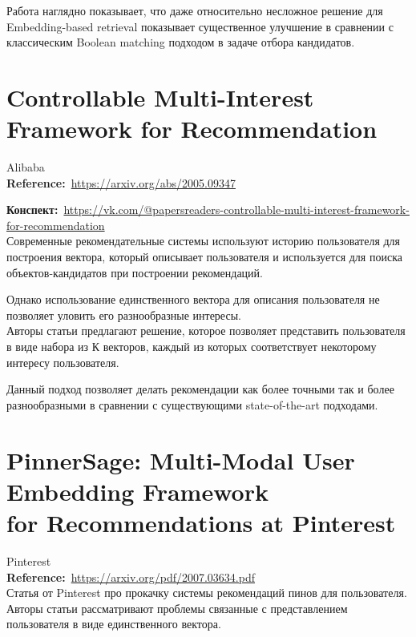 \begin{bibunit}[plainnat]
Работа наглядно показывает, что даже относительно несложное решение для Embedding-based retrieval показывает существенное улучшение в сравнении с классическим Boolean matching подходом в задаче отбора кандидатов.

\section*{Controllable Multi-Interest Framework for Recommendation}

Alibaba \\

\textbf{Reference:}~\url{https://arxiv.org/abs/2005.09347}

\textbf{Конспект:}~\url{https://vk.com/@papersreaders-controllable-multi-interest-framework-for-recommendation} \\

Современные рекомендательные системы используют историю пользователя для построения вектора, который описывает пользователя и используется для поиска объектов-кандидатов при построении рекомендаций. 

Однако использование единственного вектора для описания пользователя не позволяет уловить его разнообразные интересы. \\

Авторы статьи предлагают решение, которое позволяет представить пользователя в виде набора из К векторов, каждый из которых соответствует некоторому интересу пользователя.

Данный подход позволяет делать рекомендации как более точными так и более разнообразными в сравнении с существующими state-of-the-art подходами.

\section*{PinnerSage: Multi-Modal User Embedding Framework \\ for Recommendations at Pinterest}

Pinterest \\

\textbf{Reference:}~\url{https://arxiv.org/pdf/2007.03634.pdf} \\

Статья от Pinterest про прокачку системы рекомендаций пинов для пользователя. \\

Авторы статьи рассматривают проблемы связанные с представлением пользователя в виде единственного вектора.


\end{bibunit}
